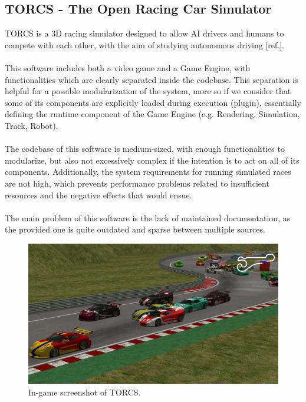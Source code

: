\subsection{TORCS - The Open Racing Car Simulator}
TORCS is a 3D racing simulator designed to allow AI drivers and humans to compete with each other, with the aim of studying autonomous driving [ref.]. \\ \\
This software includes both a video game and a Game Engine, with functionalities which are clearly separated inside the codebase. This separation is helpful for a possible modularization of the system, more so if we consider that some of its components are explicitly loaded during execution (plugin), essentially defining the runtime component of the Game Engine (e.g. Rendering, Simulation, Track, Robot). \\ \\
The codebase of this software is medium-sized, with enough functionalities to modularize, but also not excessively complex if the intention is to act on all of its components. Additionally, the system requirements for running simulated races are not high, which prevents performance problems related to insufficient resources and the negative effects that would ensue. \\ \\
The main problem of this software is the lack of maintained documentation, as the provided one is quite outdated and sparse between multiple sources.

\begin{figure}
	\centering
	\includegraphics[width=0.8\linewidth]{"immagini/Feasibility study/TORCS"}
	\caption[In-game screenshot of TORCS.]{In-game screenshot of TORCS.}
	\label{fig:torcs}
\end{figure}



